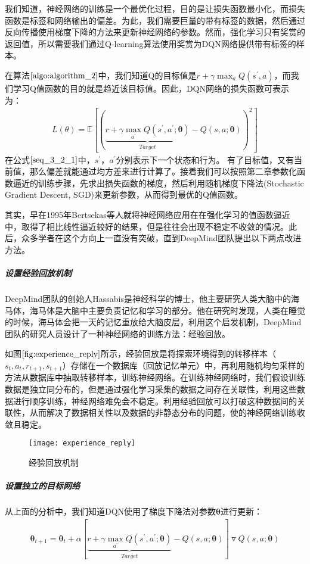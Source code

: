 我们知道，神经网络的训练是一个最优化过程，目的是让损失函数最小化，而损失函数是标签和网络输出的偏差。为此，我们需要巨量的带有标签的数据，然后通过反向传播使用梯度下降的方法来更新神经网络的参数。然而，强化学习只有奖赏的返回值，所以需要我们通过Q-learning算法使用奖赏为DQN网络提供带有标签的样本。

在算法$\ref{algo:algorithm_2}$中，我们知道Q的目标值是$r+\gamma \max_{a}Q(s^{'},a)$，而我们学习Q值函数的目的就是趋近该目标值。因此，DQN网络的损失函数可表示为：
\begin{equation}
\label{seq_3_2_1}
\begin{aligned}
L(\theta)=\mathbb{E}[(\underbrace{r+\gamma\max_{a^{'}} Q(s^{'},a^{'};\bm{\theta})}_{Target}-Q(s,a;\bm{\theta}))^{2}]
\end{aligned}
\end{equation}
在公式$\eqref{seq_3_2_1}$中，$s^{'}$，$a^{'}$分别表示下一个状态和行为。
有了目标值，又有当前值，那么偏差就能通过均方差来进行计算了。接着我们可以按照第二章参数化函数逼近的训练步骤，先求出损失函数的梯度，然后利用随机梯度下降法(Stochastic Gradient Descent, SGD)来更新参数，从而得到最优的Q值函数。

其实，早在1995年Bertsekas等人就将神经网络应用在在强化学习的值函数逼近中，取得了相比线性逼近较好的结果，但是往往会出现不稳定不收敛的情况\citep{bertsekas1995neuro}。此后，众多学者在这个方向上一直没有突破，直到DeepMind团队提出以下两点改进方法。

 \subparagraph{设置经验回放机制}
DeepMind团队的创始人Hassabis是神经科学的博士，他主要研究人类大脑中的海马体，海马体是大脑中主要负责记忆和学习的部分。他在研究时发现，人类在睡觉的时候，海马体会把一天的记忆重放给大脑皮层，利用这个启发机制，DeepMind团队的研究人员设计了一种神经网络的训练方法：经验回放。

如图$\ref{fig:experience_reply}$所示，经验回放是将探索环境得到的转移样本（$s_{t}, a_{t}, r_{t+1}, s_{t+1}$）存储在一个数据库（回放记忆单元）中，再利用随机均匀采样的方法从数据库中抽取转移样本，训练神经网络。在训练神经网络时，我们假设训练数据是独立同分布的，但是通过强化学习采集的数据之间存在关联性，利用这些数据进行顺序训练，神经网络难免会不稳定。利用经验回放可以打破这种数据间的关联性，从而解决了数据相关性以及数据的非静态分布的问题，使的神经网络训练收敛且稳定。
\begin{figure}[htbp]
\centering
\texttt{[image: experience\_reply]}
\caption{经验回放机制}
\label{fig:experience_reply}
\end{figure}

 \subparagraph{设置独立的目标网络}
从上面的分析中，我们知道DQN使用了梯度下降法对参数$\bm{\theta}$进行更新：
\begin{equation}
\begin{aligned}
\bm{\theta}_{t+1}=\bm{\theta}_{t}+\alpha[\underbrace{r+\gamma \max_{a^{'}}Q(s^{'},a^{'};\bm{\theta})}_{Target}-Q(s,a;\bm{\theta})]\triangledown Q(s,a;\bm{\theta})
\end{aligned}
\end{equation}

